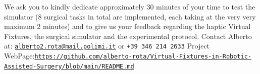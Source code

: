 \documentclass{article}
\begin{document}
\noindent We ask you to kindly dedicate approximately 30 minutes of your time to test the simulator (8 surgical tasks in total are implemented, each taking at the very very maximum 2 minutes) and to give us your feedback regarding the haptic Virtual Fixtures, the surgical simulator and the experimental protocol.
\newline \newline
{\footnotesize
Contact Alberto at: \texttt{\href{mailto:alberto2.rota@mail.polimi.it}{alberto2.rota@mail.polimi.it}} or \texttt{+39 346 214 2633}
\newline Project WebPage:\newline\noindent \href{https://github.com/alberto-rota/Virtual-Fixtures-in-Robotic-Assisted-Surgery/blob/main/README.md}{\texttt{https://github.com/alberto-rota/Virtual-Fixtures-in-Robotic-Assisted-Surgery/blob/main/README.md}
}}


\end{document}
